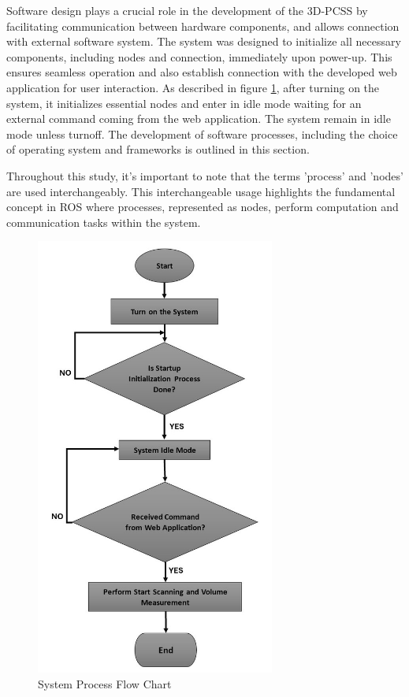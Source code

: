 Software design plays a crucial role in the development of the 3D-PCSS by facilitating communication between hardware components, and allows connection with external software system. The system was designed to initialize all necessary components, including nodes and connection, immediately upon power-up. This ensures seamless operation and also establish connection with the developed web application for user interaction. As described in figure \ref{ch4:fig:software_system_process}, after turning on the system, it initializes essential nodes and enter in idle mode waiting for an external command coming from the web application. The system remain in idle mode unless turnoff. The development of software processes, including the choice of operating system and frameworks is outlined in this section.

Throughout this study, it's important to note that the terms 'process' and 'nodes' are used interchangeably. This interchangeable usage highlights the fundamental concept in ROS where processes, represented as nodes, perform computation and communication tasks within the system.

\begin{figure}[H]
	\centering
	\includegraphics[width=0.7\textwidth, height=0.7\textheight]{Figures/software_system_process}
	\caption{System Process Flow Chart}
	\label{ch4:fig:software_system_process}
\end{figure}

